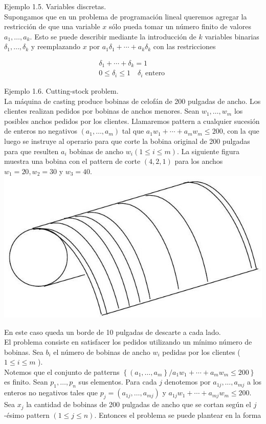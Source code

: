 \documentclass[10pt]{article}
\begin{document}
Ejemplo 1.5. Variables discretas.\\
Supongamos que en un problema de programación lineal queremos agregar la restricción de que una variable $x$ sólo pueda tomar un número finito de valores $a_{1}, \ldots, a_{k}$. Esto se puede describir mediante la introducción de $k$ variables binarias $\delta_{1}, \ldots, \delta_{k}$ y reemplazando $x$ por $a_{1} \delta_{1}+\cdots+a_{k} \delta_{k}$ con las restricciones

$$
\begin{gathered}
\delta_{1}+\cdots+\delta_{k}=1 \\
0 \leq \delta_{i} \leq 1 \quad \delta_{i} \text { entero }
\end{gathered}
$$

Ejemplo 1.6. Cutting-stock problem.\\
La máquina de casting produce bobinas de celofán de 200 pulgadas de ancho. Los clientes realizan pedidos por bobinas de anchos menores. Sean $w_{1}, \ldots, w_{m}$ los posibles anchos pedidos por los clientes. Llamaremos pattern a cualquier sucesión de enteros no negativos $\left(a_{1}, \ldots, a_{m}\right)$ tal que $a_{1} w_{1}+\cdots+a_{m} w_{m} \leq 200$, con la que luego se instruye al operario para que corte la bobina original de 200 pulgadas para que resulten $a_{i}$ bobinas de ancho $w_{i}(1 \leq i \leq m)$. La siguiente figura muestra una bobina con el pattern de corte $(4,2,1)$ para los anchos $w_{1}=20, w_{2}=30$ y $w_{3}=40$.\\
\includegraphics[max width=\textwidth, center]{2025_09_05_458e5b1ce89abceb5d44g-04}

En este caso queda un borde de 10 pulgadas de descarte a cada lado.\\
El problema consiste en satisfacer los pedidos utilizando un mínimo número de bobinas. Sea $b_{i}$ el número de bobinas de ancho $w_{i}$ pedidas por los clientes ( $1 \leq i \leq m$ ).\\
Notemos que el conjunto de patterns $\left\{\left(a_{1}, \ldots, a_{m}\right\} / a_{1} w_{1}+\cdots+a_{m} w_{m} \leq 200\right\}$ es finito. Sean $p_{1}, \ldots, p_{n}$ sus elementos. Para cada $j$ denotemos por $a_{1 j}, \ldots, a_{m j}$ a los enteros no negativos tales que $p_{j}=\left(a_{1 j}, \ldots, a_{m j}\right)$ y $a_{1 j} w_{1}+\cdots+a_{m j} w_{m} \leq 200$. Sea $x_{j}$ la cantidad de bobinas de 200 pulgadas de ancho que se cortan según el $j$-ésimo pattern $(1 \leq j \leq n)$. Entonces el problema se puede plantear en la forma
\end{document}
